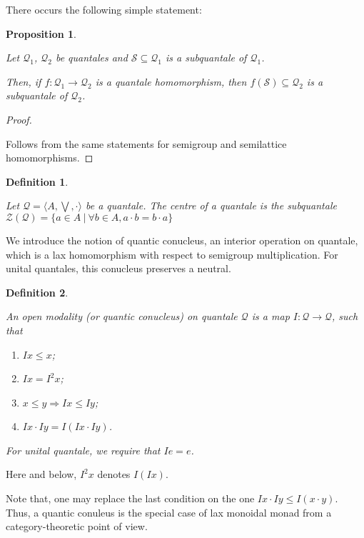 \documentclass[a4paper]{article}
\theoremstyle{defin}
\newtheorem{defin}{Definition}
\theoremstyle{theorem}
\theoremstyle{prop}
\newtheorem{prop}{Proposition}
\theoremstyle{lemma}
\theoremstyle{ex}
\theoremstyle{col}
\begin{document}
There occurs the following simple statement:

\begin{prop}
  $ $

Let $\mathcal{Q}_1$, $\mathcal{Q}_2$ be quantales and $\mathcal{S} \subseteq \mathcal{Q}_1$ is a subquantale of
$\mathcal{Q}_1$.

Then, if $f : \mathcal{Q}_1 \to \mathcal{Q}_2$ is a quantale homomorphism, then $f(\mathcal{S}) \subseteq \mathcal{Q}_2$ is a subquantale of $\mathcal{Q}_2$.
\end{prop}

\begin{proof}
$ $

  Follows from the same statements for semigroup and semilattice homomorphisms.
\end{proof}

\begin{defin}
$ $

  Let $\mathcal{Q} = \langle A, \bigvee, \cdot \rangle$ be a quantale.
  The centre of a quantale is the subquantale $\mathcal{Z}(\mathcal{Q}) = \{ a \in A \: | \: \forall b \in A, a \cdot b = b \cdot a \}$
\end{defin}

We introduce the notion of quantic conucleus, an interior operation on quantale, which is a lax homomorphism with respect to semigroup multiplication. For unital quantales, this conucleus preserves a neutral.

\begin{defin}
$ $

  An open modality (or quantic conucleus) on quantale $\mathcal{Q}$ is a map $I : \mathcal{Q} \to \mathcal{Q}$, such that

\begin{enumerate}
  \item $I x \leq x$;
  \item $I x = I^2 x$;
  \item $x \leq y \Rightarrow I x \leq I y$;
  \item $I x \cdot I y = I (I x \cdot I y)$.
\end{enumerate}

For unital quantale, we require that $I e = e$.
\end{defin}

Here and below, $I^2 x$ denotes $I (I x)$.

Note that, one may replace the last condition on the one $I x \cdot I y \leq I (x \cdot y)$. Thus, a quantic conuleus is the special case of lax monoidal monad from a category-theoretic point of view.
\end{document}
